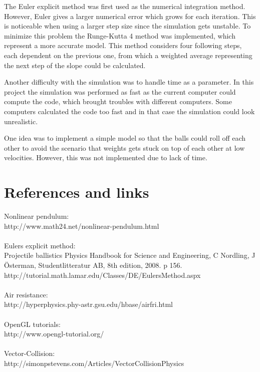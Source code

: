 \documentclass[a4paper,12pt,twoside,english]{article}
\begin{document}
The Euler explicit method was first used as the numerical integration method. However, Euler gives a larger numerical error which grows for each iteration. This is noticeable when using a larger step size since the simulation gets unstable. To minimize this problem the Runge-Kutta 4 method was implemented, which represent a more accurate model. This method considers four following steps, each dependent on the previous one, from which a weighted average representing the next step of the slope could be calculated. 

Another difficulty with the simulation was to handle time as a parameter. In this project the simulation was performed as fast as the current computer could compute the code, which brought troubles with different computers. Some computers calculated the code too fast and in that case the simulation could look unrealistic.

One idea was to implement a simple model so that the balls could roll off each other to avoid the scenario that weights gets stuck on top of each other at low velocities. However, this was not implemented due to lack of time. 

\section{References and links}

Nonlinear pendulum: \\
http://www.math24.net/nonlinear-pendulum.html \\\\
Eulers explicit method: \\
Projectile ballistics
Physics Handbook for Science and Engineering, 
C Nordling, J \"{O}sterman, Studentlitteratur AB, 8th edition, 2008. 
p 156. \\
http://tutorial.math.lamar.edu/Classes/DE/EulersMethod.aspx\\\\
Air resistance: \\
http://hyperphysics.phy-astr.gsu.edu/hbase/airfri.html\\\\
OpenGL tutorials: \\
http://www.opengl-tutorial.org/\\\\
Vector-Collision: \\
http://simonpstevens.com/Articles/VectorCollisionPhysics\\\\
\end{document}
